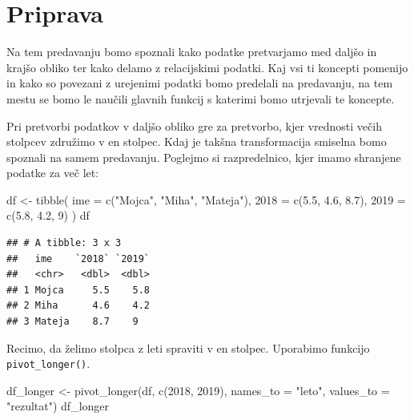 \documentclass[
]{book}
\newenvironment{Shaded}{\begin{snugshade}}{\end{snugshade}}
\newcommand{\AttributeTok}[1]{\textcolor[rgb]{0.77,0.63,0.00}{#1}}
\newcommand{\DecValTok}[1]{\textcolor[rgb]{0.00,0.00,0.81}{#1}}
\newcommand{\FloatTok}[1]{\textcolor[rgb]{0.00,0.00,0.81}{#1}}
\newcommand{\FunctionTok}[1]{\textcolor[rgb]{0.00,0.00,0.00}{#1}}
\newcommand{\NormalTok}[1]{#1}
\newcommand{\OtherTok}[1]{\textcolor[rgb]{0.56,0.35,0.01}{#1}}
\newcommand{\StringTok}[1]{\textcolor[rgb]{0.31,0.60,0.02}{#1}}
\begin{document}
\hypertarget{priprava-1}{%
\section{Priprava}\label{priprava-1}}

Na tem predavanju bomo spoznali kako podatke pretvarjamo med daljšo in krajšo obliko ter kako delamo z relacijskimi podatki. Kaj vsi ti koncepti pomenijo in kako so povezani z urejenimi podatki bomo predelali na predavanju, na tem mestu se bomo le naučili glavnih funkcij s katerimi bomo utrjevali te koncepte.

Pri pretvorbi podatkov v daljšo obliko gre za pretvorbo, kjer vrednosti večih stolpcev združimo v en stolpec. Kdaj je takšna transformacija smiselna bomo spoznali na samem predavanju. Poglejmo si razpredelnico, kjer imamo shranjene podatke za več let:

\begin{Shaded}
\begin{Highlighting}[]
\NormalTok{df }\OtherTok{\textless{}{-}} \FunctionTok{tibble}\NormalTok{(}
  \AttributeTok{ime =} \FunctionTok{c}\NormalTok{(}\StringTok{"Mojca"}\NormalTok{, }\StringTok{"Miha"}\NormalTok{, }\StringTok{"Mateja"}\NormalTok{),}
  \StringTok{\textasciigrave{}}\AttributeTok{2018}\StringTok{\textasciigrave{}} \OtherTok{=} \FunctionTok{c}\NormalTok{(}\FloatTok{5.5}\NormalTok{, }\FloatTok{4.6}\NormalTok{, }\FloatTok{8.7}\NormalTok{),}
  \StringTok{\textasciigrave{}}\AttributeTok{2019}\StringTok{\textasciigrave{}} \OtherTok{=} \FunctionTok{c}\NormalTok{(}\FloatTok{5.8}\NormalTok{, }\FloatTok{4.2}\NormalTok{, }\DecValTok{9}\NormalTok{)}
\NormalTok{)}
\NormalTok{df}
\end{Highlighting}
\end{Shaded}

\begin{verbatim}
## # A tibble: 3 x 3
##   ime    `2018` `2019`
##   <chr>   <dbl>  <dbl>
## 1 Mojca     5.5    5.8
## 2 Miha      4.6    4.2
## 3 Mateja    8.7    9
\end{verbatim}

Recimo, da želimo stolpca z leti spraviti v en stolpec. Uporabimo funkcijo \texttt{pivot\_longer()}.

\begin{Shaded}
\begin{Highlighting}[]
\NormalTok{df\_longer }\OtherTok{\textless{}{-}} \FunctionTok{pivot\_longer}\NormalTok{(df, }\FunctionTok{c}\NormalTok{(}\StringTok{\textasciigrave{}}\AttributeTok{2018}\StringTok{\textasciigrave{}}\NormalTok{, }\StringTok{\textasciigrave{}}\AttributeTok{2019}\StringTok{\textasciigrave{}}\NormalTok{), }\AttributeTok{names\_to =} \StringTok{"leto"}\NormalTok{, }\AttributeTok{values\_to =} \StringTok{"rezultat"}\NormalTok{)}
\NormalTok{df\_longer}
\end{Highlighting}
\end{Shaded}
\end{document}
